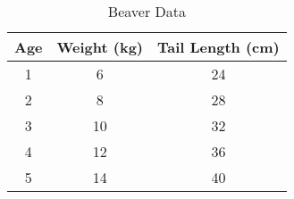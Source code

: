 \begin{table}[H]
\centering
\begin{tabular}{|c|c|c|}
\hline
\textbf{Age} & \textbf{Weight (kg)} & \textbf{Tail Length (cm)} \\
\hline
1 & 6 & 24 \\
2 & 8 & 28 \\
3 & 10 & 32 \\
4 & 12 & 36 \\
5 & 14 & 40 \\
\hline
\end{tabular}
\caption{Beaver Data}
\end{table}